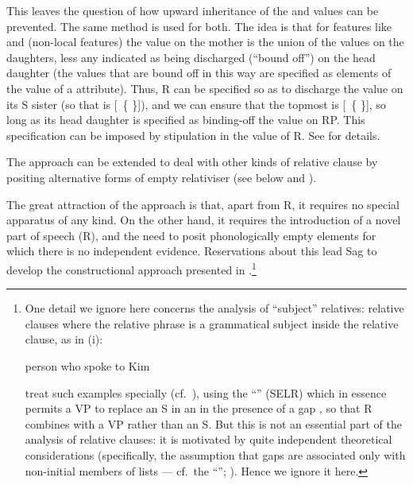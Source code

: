 \documentclass[output=paper
 	        ,biblatex
                ,babelshorthands
                ,newtxmath
                ,draftmode
                ,colorlinks, citecolor=brown
]{langscibook}
\begin{document}
This leaves the question of how upward inheritance of the  and 
values can be prevented. The same method is used for both. The idea is that for features
like  and  (non-local features) the value on the mother is the
union of the values on the daughters, less any indicated as being discharged
(``bound off'') on the head daughter (the values that are bound off in this way are
specified as elements of the value of a  attribute). Thus, R can be specified so as to discharge the
 value on its S sister (so that  is [~\{ \}]), and we can
ensure that the topmost  is [~\{ \}], so long as its head  daughter is specified as
binding-off the  value on RP. This specification can be imposed by stipulation
in the  value of R.  See \cite[164]{Pollard:Sag:94} for details.

The approach can be extended to deal with other kinds of relative clause by positing
alternative forms of empty relativiser (see below and \citealt[Chapter~5]{Pollard:Sag:94}).

The great attraction of the approach is that, apart from R, it requires no special
apparatus of any kind. On the other hand, it requires the introduction of a novel part
of speech (R), and the need to posit phonologically empty elements for which there is no
independent evidence. Reservations about this lead Sag to develop the constructional
approach presented in \cite{Sag:97}.\footnote{\label{fn:rc-1}%
One detail we ignore here concerns the analysis of ``subject'' relatives: relative clauses where
the relative phrase is a grammatical subject inside the relative clause, as in (i):
\begin{exe}
  \ex\label{x:rc-40} person who spoke to Kim 
\end{exe}
\cite{Pollard:Sag:94} treat such examples specially (cf.\
\citealt[218--219]{Pollard:Sag:94}), using the ``'' (SELR)
which in essence permits a VP to replace an S in an \feat{arg-st} in the presence of a
gap \citep[174]{Pollard:Sag:94}, so that R combines with a VP rather than an S. But this
is not an essential part of the analysis of relative clauses: it is motivated by quite
independent theoretical considerations (specifically, the assumption that gaps are
associated only with non-initial members of \feat{arg-st} lists --- cf.\ the
``\isi{Trace-Principle}''; \citealt[172]{Pollard:Sag:94}). Hence we ignore it here.}
\end{document}
